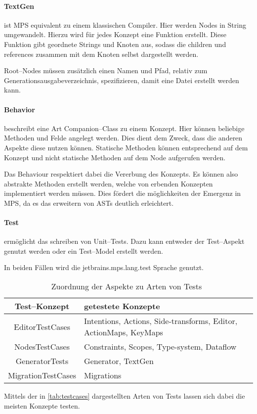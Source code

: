 \paragraph{TextGen} ist \ac{MPS} equivalent zu einem klassischen Compiler.
Hier werden Nodes in String umgewandelt.
Hierzu wird für jedes Konzept eine Funktion erstellt.
Diese Funktion gibt geordnete Strings und Knoten aus, sodass die {\ttfamily children} und {\ttfamily references} zusammen mit dem Knoten selbst dargestellt werden.

Root--Nodes müssen zusätzlich einen Namen und Pfad, relativ zum Generationsausgabeverzeichnis, spezifizieren, damit eine Datei erstellt werden kann.

\paragraph{Behavior} beschreibt eine Art Companion--Class zu einem Konzept.
Hier können beliebige Methoden und Felde angelegt werden.
Dies dient dem Zweck, dass die anderen Aspekte diese nutzen können.
Statische Methoden können entsprechend auf dem Konzept und nicht statische Methoden auf dem Node aufgerufen werden.

Das Behaviour respektiert dabei die Vererbung des Konzepts.
Es können also abstrakte Methoden erstellt werden, welche von erbenden Konzepten implementiert werden müssen.
Dies fördert die möglichkeiten der Emergenz in \ac{MPS}, da es das erweitern von \acp{AST} deutlich erleichtert.

\paragraph{Test} ermöglicht das schreiben von Unit--Tests.
Dazu kann entweder der Test--Aspekt genutzt werden oder ein Test--Model erstellt werden.

In beiden Fällen wird die {\ttfamily jetbrains.mps.lang.test} Sprache genutzt.
\begin{table}[ht]
    \centering
    \begin{tabular}{|c|p{\textwidth-5cm}|}
        \hline
        \textbf{Test--Konzept}    & \textbf{getestete Konzepte}                                       \\
        \hline
        \hline
        {\ttfamily EditorTestCases}    & Intentions, Actions, Side-transforms, Editor, ActionMaps, KeyMaps \\
        \hline
        {\ttfamily NodesTestCases}     & Constraints, Scopes, Type-system, Dataflow                        \\
        \hline
        {\ttfamily GeneratorTests}     & Generator, TextGen                                                \\
        \hline
        {\ttfamily MigrationTestCases} & Migrations                                                        \\
        \hline
    \end{tabular}
    \caption{Zuordnung der Aspekte zu Arten von Tests~\autocite{jetbrains-sro-no-dateE}}
    \label{tab:testcases}
\end{table}
Mittels der in \autoref{tab:testcases} dargestellten Arten von Tests lassen sich dabei die meisten Konzepte testen.

